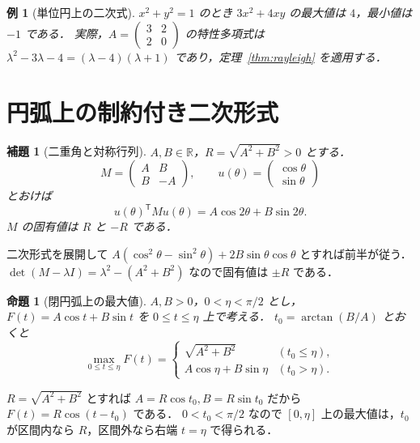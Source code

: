 \documentclass[a5paper,10pt,onecolumn]{jsarticle}
\makeatletter
\theoremstyle{mathnotetheorem}
\newtheorem{lemma}[theorem]{補題}
\newtheorem{proposition}[theorem]{命題}
\newtheorem{example}[theorem]{例}
\renewcommand{\proofname}{証明}
\renewenvironment{proof}[1][\proofname]{%
  \par\pushQED{\qed}\normalfont\topsep4\p@\@plus2\p@\relax
  \trivlist\item[\hskip\labelsep\bfseries #1]\ignorespaces
}{\popQED\endtrivlist\@endpefalse}
\makeatother
\begin{document}
\begin{example}[単位円上の二次式]
$x^2+y^2=1$ のとき $3x^2+4xy$ の最大値は $4$，最小値は $-1$ である．
実際，$A=\begin{pmatrix}3&2\\2&0\end{pmatrix}$ の特性多項式は $\lambda^2-3\lambda-4=(\lambda-4)(\lambda+1)$ であり，定理~\ref{thm:rayleigh} を適用する．
\end{example}

\section{円弧上の制約付き二次形式}
\begin{lemma}[二重角と対称行列]\label{lem:matrix}
$A,B\in\mathbb R$，$R=\sqrt{A^2+B^2}>0$ とする．
\[
 M=\begin{pmatrix}A&B\\B&-A\end{pmatrix},\qquad
 u(\theta)=\begin{pmatrix}\cos\theta\\\sin\theta\end{pmatrix}
\]
とおけば
\[
 u(\theta)^{\mathsf T}Mu(\theta)
 =A\cos2\theta+B\sin2\theta.
\]
$M$ の固有値は $R$ と $-R$ である．
\end{lemma}
\begin{proof}
二次形式を展開して $A(\cos^2\theta-\sin^2\theta)+2B\sin\theta\cos\theta$ とすれば前半が従う．
$\det(M-\lambda I)=\lambda^2-(A^2+B^2)$ なので固有値は $\pm R$ である．
\end{proof}

\begin{proposition}[閉円弧上の最大値]\label{prop:arc}
$A,B>0$，$0<\eta<\pi/2$ とし，$F(t)=A\cos t+B\sin t$ を $0\le t\le\eta$ 上で考える．
$t_0=\arctan(B/A)$ とおくと
\[
 \max_{0\le t\le\eta}F(t)
 =\begin{cases}
 \sqrt{A^2+B^2}&(t_0\le\eta),\\
 A\cos\eta+B\sin\eta&(t_0>\eta).
 \end{cases}
\]
\end{proposition}
\begin{proof}
$R=\sqrt{A^2+B^2}$ とすれば $A=R\cos t_0,B=R\sin t_0$ だから $F(t)=R\cos(t-t_0)$ である．
$0<t_0<\pi/2$ なので $[0,\eta]$ 上の最大値は，$t_0$ が区間内なら $R$，区間外なら右端 $t=\eta$ で得られる．
\end{proof}
\end{document}
